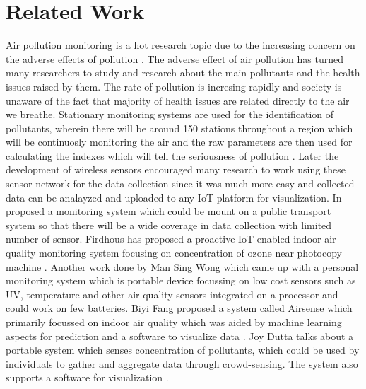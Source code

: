 \documentclass[11pt]{article}
\begin{document}
\section{Related Work}

Air pollution monitoring is a hot research topic due to the increasing concern on the adverse effects of pollution \cite{YLL12}. The adverse effect of air pollution has turned many researchers to study and research about the main pollutants and the health issues raised by them. The rate of pollution is incresing rapidly and society is unaware of the fact that majority of health issues are related directly to the air we breathe. Stationary monitoring systems are used for the identification of pollutants, wherein there will be around 150 stations throughout a region which will be continuosly monitoring the air and the raw  parameters are then used for calculating the indexes which will tell the seriousness of pollution \cite{Gov}. Later the development of wireless sensors encouraged many research to work using these sensor network for the data collection since it was much more easy and collected data can be analayzed and uploaded to any IoT platform for visualization. In \cite{YLL12} proposed a monitoring system which could be mount on a public transport system so that there will be a wide coverage in data collection with limited number of sensor. Firdhous has proposed a proactive IoT-enabled indoor air quality monitoring system focusing on concentration of ozone near photocopy machine \cite{FSK17}. Another work done by Man Sing Wong which came up with a personal monitoring system which is portable device focussing on low cost sensors such as UV, temperature and other air quality sensors integrated on a processor and could work on few batteries\cite{WYM14}. Biyi Fang proposed a system called Airsense which primarily focussed on indoor air quality which was aided by machine learning aspects for prediction and a software to visualize data \cite{FXP16}. Joy Dutta talks about a portable system which senses concentration of pollutants, which could be used by individuals to gather and aggregate data through crowd-sensing. The system also supports a software for visualization \cite{DCRMG17}.
\end{document}
